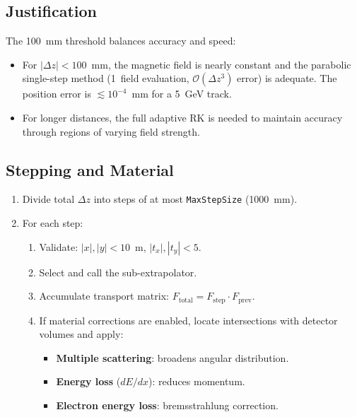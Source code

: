 \documentclass[11pt,a4paper]{article}
\newcommand{\dz}{\Delta z}
\begin{document}
\subsection{Justification}

The 100~mm threshold balances accuracy and speed:
\begin{itemize}[nosep]
  \item For $|\dz| < 100$~mm, the magnetic field is nearly constant and the
        parabolic single-step method (1~field evaluation, $\mathcal{O}(\dz^3)$
        error) is adequate. The position error is
        $\lesssim 10^{-4}$~mm for a 5~GeV track.
  \item For longer distances, the full adaptive RK is needed to maintain
        accuracy through regions of varying field strength.
\end{itemize}

\subsection{Stepping and Material}

\begin{enumerate}[nosep]
  \item Divide total $\dz$ into steps of at most \texttt{MaxStepSize} (1000~mm).
  \item For each step:
    \begin{enumerate}[nosep]
      \item Validate: $|x|,|y| < 10$~m, $|t_x|,|t_y| < 5$.
      \item Select and call the sub-extrapolator.
      \item Accumulate transport matrix: $F_\text{total} = F_\text{step} \cdot F_\text{prev}$.
      \item If material corrections are enabled, locate intersections with
            detector volumes and apply:
            \begin{itemize}[nosep]
              \item \textbf{Multiple scattering}: broadens angular distribution.
              \item \textbf{Energy loss} ($dE/dx$): reduces momentum.
              \item \textbf{Electron energy loss}: bremsstrahlung correction.
            \end{itemize}
    \end{enumerate}
\end{enumerate}
\end{document}
